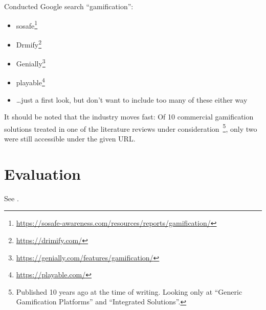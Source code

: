 \documentclass[runningheads]{llncs}
\begin{document}
Conducted Google search \enquote{gamification}:
\begin{itemize}
    \item sosafe\footnote{\url{https://sosafe-awareness.com/resources/reports/gamification/}}
    \item Drmify\footnote{\url{https://drimify.com/}}
    \item Genially\footnote{\url{https://genially.com/features/gamification/}}
    \item playable\footnote{\url{https://playable.com/}}
    \item \ldots just a first look, but don't want to include too many of these either way
\end{itemize}
%
It should be noted that the industry moves fast: Of 10 commercial gamification solutions treated in one of the literature reviews under consideration~\cite{HeAWS15}\footnote{Published 10 years ago at the time of writing. Looking only at \enquote{Generic Gamification Platforms} and \enquote{Integrated Solutions}.}, only two were still accessible under the given URL\@.

\section{Evaluation}

See .
\end{document}
